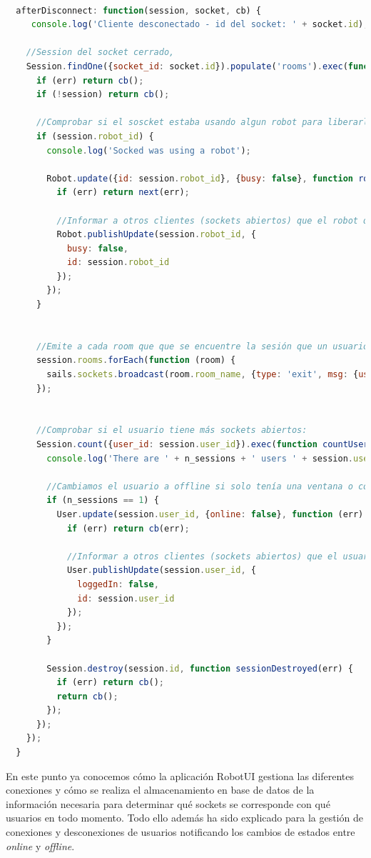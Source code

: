 \begin{lstlisting}[language=JavaScript]

  afterDisconnect: function(session, socket, cb) {
     console.log('Cliente desconectado - id del socket: ' + socket.id);

    //Session del socket cerrado,
    Session.findOne({socket_id: socket.id}).populate('rooms').exec(function (err, session) {
      if (err) return cb();
      if (!session) return cb();

      //Comprobar si el soscket estaba usando algun robot para liberarlo:
      if (session.robot_id) {
        console.log('Socked was using a robot');

        Robot.update({id: session.robot_id}, {busy: false}, function robotUpdated(err) {
          if (err) return next(err);

          //Informar a otros clientes (sockets abiertos) que el robot queda liberado
          Robot.publishUpdate(session.robot_id, {
            busy: false,
            id: session.robot_id
          });
        });
      }


      //Emite a cada room que que se encuentre la sesión que un usuario la ha abandonado ->  
      session.rooms.forEach(function (room) {
        sails.sockets.broadcast(room.room_name, {type: 'exit', msg: {user_id: session.user_id}});
      });


      //Comprobar si el usuario tiene más sockets abiertos:
      Session.count({user_id: session.user_id}).exec(function countUserSessions(error, n_sessions) {
        console.log('There are ' + n_sessions + ' users ' + session.user_id);

        //Cambiamos el usuario a offline si solo tenía una ventana o conexión abierta.
        if (n_sessions == 1) {
          User.update(session.user_id, {online: false}, function (err) {
            if (err) return cb(err);

            //Informar a otros clientes (sockets abiertos) que el usuario ya NO se encuentra logueado
            User.publishUpdate(session.user_id, {
              loggedIn: false,
              id: session.user_id
            });
          });
        }

        Session.destroy(session.id, function sessionDestroyed(err) {
          if (err) return cb();
          return cb();
        });
      });
    });
  }

\end{lstlisting}
  
 
 En este punto ya conocemos cómo la aplicación RobotUI gestiona las diferentes conexiones y cómo se realiza el almacenamiento en base de datos de la información necesaria para determinar qué sockets se 
 corresponde con qué usuarios en todo momento. Todo ello además ha sido explicado para la gestión de conexiones y desconexiones de usuarios notificando los cambios de estados entre \emph{online} y \emph{offline}.\\
 
